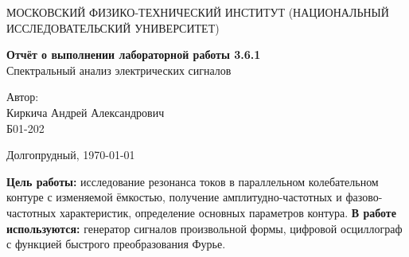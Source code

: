 


	\begin{center}
		{\large МОСКОВСКИЙ ФИЗИКО-ТЕХНИЧЕСКИЙ ИНСТИТУТ (НАЦИОНАЛЬНЫЙ ИССЛЕДОВАТЕЛЬСКИЙ УНИВЕРСИТЕТ)}
	\end{center}
	
	\vspace{4.5cm}
	{\huge
		\begin{center}
			{\bf Отчёт о выполнении лабораторной работы 3.6.1}\\
			Спектральный анализ электрических сигналов
		\end{center}
	}
	\vspace{2cm}
	\begin{flushright}
		{\LARGE Автор:\\ Киркича Андрей Александрович \\
			\vspace{0.2cm}
			Б01-202}
	\end{flushright}
	\vspace{3.2cm}
	\begin{center}
		Долгопрудный, 
		\today
	\end{center}
\n
\textbf{Цель работы: }
исследование резонанса токов в параллельном колебательном контуре с изменяемой ёмкостью, получение амплитудно-частотных и фазово-частотных характеристик, определение основных параметров контура.
	\n\n
	\textbf{В работе используются: }
	генератор сигналов произвольной формы, цифровой осциллограф с функцией быстрого преобразования Фурье.
	
